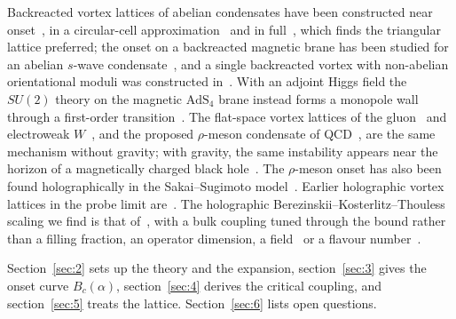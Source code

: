 Backreacted vortex lattices of abelian condensates have been constructed
near onset~\cite{Bao:2013fda}, in a circular-cell
approximation~\cite{Tallarita:2019amp} and in full~\cite{Donos:2020viz},
which finds the triangular lattice preferred; the onset on a backreacted magnetic brane
has been studied for an abelian $s$-wave condensate~\cite{Chernicoff:2024ymn},
and a single backreacted vortex with non-abelian orientational moduli was
constructed in~\cite{Tallarita:2019czh}. With an adjoint Higgs field the
$SU(2)$ theory on the magnetic $\mathrm{AdS}_4$ brane instead forms a
monopole wall through a first-order transition~\cite{Bolognesi:2010nb}. The
flat-space vortex lattices of the gluon~\cite{Ambjorn:1980ms} and
electroweak $W$~\cite{Ambjorn:1988fx,Ambjorn:1988tm}, and the proposed
$\rho$-meson condensate of QCD~\cite{Chernodub:2010qx,Adhikari:2024bfa},
are the same mechanism without gravity; with gravity, the same instability
appears near the horizon of a magnetically charged black
hole~\cite{Lee:1991qs,Maldacena:2020skw}. The $\rho$-meson onset has also
been found holographically in the Sakai--Sugimoto
model~\cite{Callebaut:2011ab,Callebaut:2013wba}. Earlier holographic vortex lattices in the probe
limit are~\cite{Maeda:2009vf,Murray:2011gr}. The holographic
Berezinskii--Kosterlitz--Thouless scaling we find is that
of~\cite{Kaplan:2009kr,Jensen:2010ga,Iqbal:2010eh}, with a bulk coupling
tuned through the bound rather than a filling fraction, an
operator dimension, a field~\cite{Faulkner:2010gj} or a flavour
number~\cite{Alho:2013dka}.

Section~\ref{sec:2} sets up the theory and the expansion,
section~\ref{sec:3} gives the onset curve $B_c(\alpha)$,
section~\ref{sec:4} derives the critical coupling, and section~\ref{sec:5}
treats the lattice. Section~\ref{sec:6} lists open questions.
